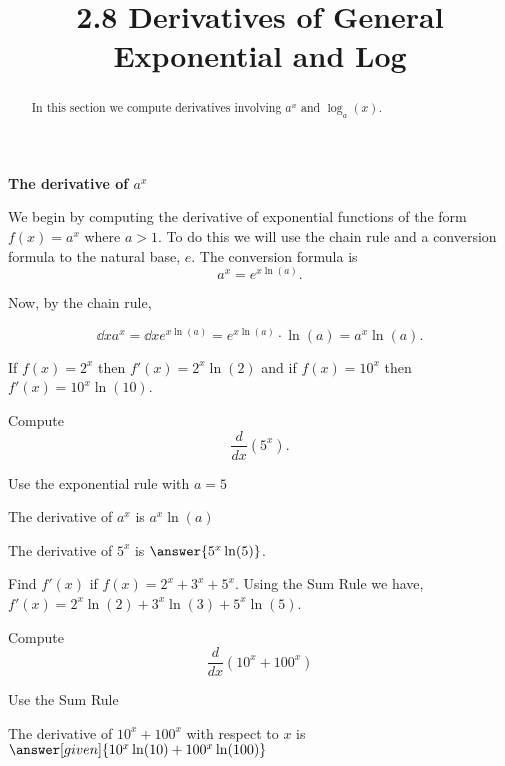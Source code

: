 \documentclass{ximera}
\title{2.8 Derivatives of General Exponential and Log}
\begin{document}
\begin{abstract}
In this section we compute derivatives involving $a^x$ and $\log_a(x)$.
\end{abstract}

\maketitle




\begin{center}
\textbf{The derivative of $a^x$}
\end{center}


We begin by computing the derivative of exponential functions of the form  $f(x) = a^x$ where $a > 1$. 
To do this we will use the chain rule and a conversion formula to the natural base, $e$.
The conversion formula is 
\[
a^x = e^{x\ln(a)}.
\]

Now, by the chain rule,

\[
\dd{x} a^x = \dd{x} e^{x\ln(a)}  = e^{x\ln(a)}\cdot \ln(a) = a^x \ln(a).
\]



\begin{example} %
If $f(x) = 2^x$ then $f'(x) = 2^x \ln(2)$
and if $f(x) = 10^x$ then $f'(x) = 10^x \ln(10)$.
\end{example}



\begin{problem}
Compute
\[
\frac{d}{dx} \left(5^x\right).
\]
\begin{hint}
Use the exponential rule with $a = 5$
\end{hint}
\begin{hint}
The derivative of $a^x$ is $a^x\ln(a)$
\end{hint}
The derivative of $5^x$ is $\answer{5^x\ln(5)}$.
\end{problem}




\begin{example} %
 Find $f'(x)$ if $f(x) = 2^x + 3^x + 5^x.$
Using the Sum Rule we have, $f'(x) = 2^x\ln(2) + 3^x\ln(3) + 5^x\ln(5)$.
\end{example}


\begin{problem} %
  Compute 
  \[
  \frac{d}{dx} \left(10^x + 100^x\right)
  \]
  
    \begin{hint}
      Use the Sum Rule
    \end{hint}    
		The derivative of $10^x + 100^x$ with respect to $x$ is
		 $\answer[given]{10^x \ln(10) + 100^x \ln(100)}$
	
\end{problem}
\end{document}
